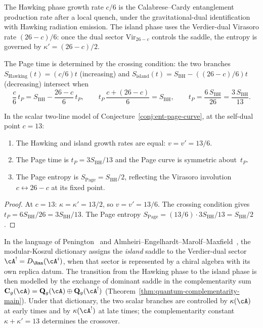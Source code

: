 \begin{remark}
The Hawking phase growth rate $c/6$ is the Calabrese--Cardy
entanglement production rate after a local quench, under the
gravitational-dual identification with Hawking radiation emission.
The island phase uses the Verdier-dual Virasoro rate $(26-c)/6$:
once the dual sector $\mathrm{Vir}_{26-c}$ controls the saddle, the
entropy is governed by $\kappa'=(26-c)/2$.

The Page time is determined by the crossing condition:
the two branches
$S_{\mathrm{Hawking}}(t) = (c/6)t$ (increasing)
and
$S_{\mathrm{island}}(t) = S_{\mathrm{BH}} - ((26{-}c)/6)t$
(decreasing) intersect when
\[
\frac{c}{6}\,t_P = S_{\mathrm{BH}} - \frac{26{-}c}{6}\,t_P,
\qquad
t_P\,\frac{c + (26{-}c)}{6} = S_{\mathrm{BH}},
\qquad
t_P = \frac{6\,S_{\mathrm{BH}}}{26}
= \frac{3\,S_{\mathrm{BH}}}{13}.
\]
\end{remark}

\begin{corollary}
\label{cor:ent-page-self-dual}
In the scalar two-line model of
Conjecture~\textup{\ref{conj:ent-page-curve}}, at the self-dual point
$c = 13$:
\begin{enumerate}[label=\textup{(\alph*)}]
\item The Hawking and island growth rates are equal:
 $v = v' = 13/6$.
\item The Page time is $t_P = 3S_{\mathrm{BH}}/13$
 and the Page curve is symmetric about~$t_P$.
\item The Page entropy is
 $S_{\mathrm{Page}} = S_{\mathrm{BH}}/2$,
 reflecting the Virasoro involution $c\leftrightarrow 26-c$ at its
 fixed point.
\end{enumerate}
\end{corollary}

\begin{proof}
At $c = 13$: $\kappa = \kappa' = 13/2$, so $v = v' = 13/6$.
The crossing condition gives
$t_P = 6S_{\mathrm{BH}}/26 = 3S_{\mathrm{BH}}/13$.
The Page entropy $S_{\mathrm{Page}}
= (13/6)\cdot 3S_{\mathrm{BH}}/13 = S_{\mathrm{BH}}/2$.
\end{proof}

\begin{remark}
\label{rem:ent-island-koszul}
In the language of
Penington~\cite{Penington19} and
Almheiri--Engelhardt--Marolf--Maxfield~\cite{AEMM19},
the modular-Koszul dictionary assigns the \emph{island} saddle to
the Verdier-dual sector
$\cA^!=D_{\Ran}(\cA^i)$, when that sector is represented by a chiral
algebra with its own replica datum.  The transition from the Hawking
phase to the island phase is then modelled by the exchange of dominant
saddle
in the complementarity sum
$\mathbf{C}_g(\cA) = \mathbf{Q}_g(\cA) \oplus
\mathbf{Q}_g(\cA^!)$
(Theorem~\ref{thm:quantum-complementarity-main}).
Under that dictionary, the two scalar branches are controlled by
$\kappa(\cA)$ at early times and by $\kappa(\cA^!)$ at late times;
the complementarity constant $\kappa + \kappa' = 13$
determines the crossover.
\end{remark}

